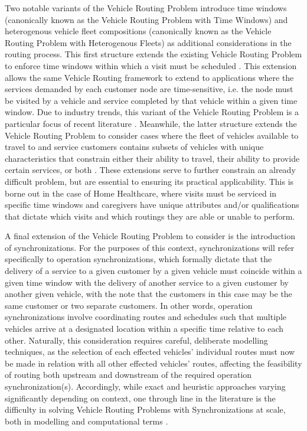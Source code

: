 \documentclass[11pt,twoside]{article}
\numberwithin{Theorem}{section}
\numberwithin{Definition}{section}
\numberwithin{Lemma}{section}
\numberwithin{Algorithm}{section}
\numberwithin{equation}{section}
\begin{document}
Two notable variants of the Vehicle Routing Problem introduce time windows (canonically known as the Vehicle Routing Problem with Time Windows) and heterogenous vehicle fleet compositions (canonically known as the Vehicle Routing Problem with Heterogenous Fleets) as additional considerations in the routing process. This first structure extends the existing Vehicle Routing Problem to enforce time windows within which a visit must be scheduled \cite{desroisiers-solomon}. This extension allows the same Vehicle Routing framework to extend to applications where the services demanded by each customer node are time-sensitive, i.e. the node must be visited by a vehicle and service completed by that vehicle within a given time window. Due to industry trends, this variant of the Vehicle Routing Problem is a particular focus of recent literature \cite{TanetYeh}. Meanwhile, the latter structure extends the Vehicle Routing Problem to consider cases where the fleet of vehicles available to travel to and service customers contains subsets of vehicles with unique characteristics that constrain either their ability to travel, their ability to provide certain services, or both \cite{WassanOsman}. These extensions serve to further constrain an already difficult problem, but are essential to ensuring its practical applicability. This is borne out in the case of Home Healthcare, where visits must be serviced in specific time windows and caregivers have unique attributes and/or qualifications that dictate which visits and which routings they are able or unable to perform.

A final extension of the Vehicle Routing Problem to consider is the introduction of synchronizations. For the purposes of this context, synchronizations will refer specifically to operation synchronizations, which formally dictate that the delivery of a service to a given customer by a given vehicle must coincide within a given time window with the delivery of another service to a given customer by another given vehicle, with the note that the customers in this case may be the same customer or two separate customers. In other words, operation synchronizations involve coordinating routes and schedules such that multiple vehicles arrive at a designated location within a specific time relative to each other. Naturally, this consideration requires careful, deliberate modelling techniques, as the selection of each effected vehicles' individual routes must now be made in relation with all other effected vehicles' routes, affecting the feasibility of routing both upstream and downstream of the required operation synchronization(s). Accordingly, while exact and heuristic approaches varying significantly depending on context, one through line in the literature is the difficulty in solving Vehicle Routing Problems with Synchronizations at scale, both in modelling and computational terms \cite{drexl}. 
\end{document}
